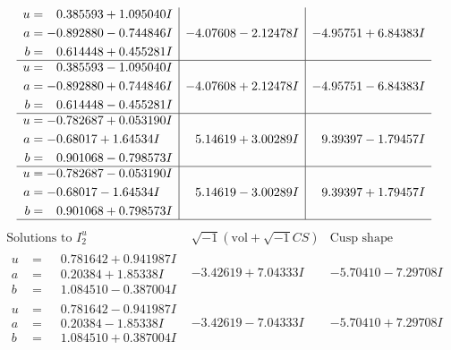 \documentclass[1p]{elsarticle_modified}
\theoremstyle{definition}
\newcommand{\I}{\sqrt{-1}}
\begin{document}
$$\begin{array}{c|c|c}
\begin{aligned}
u &= \phantom{-}0.385593 + 1.095040 I \\
a &= -0.892880 - 0.744846 I \\
b &= \phantom{-}0.614448 + 0.455281 I\end{aligned}
 & -4.07608 - 2.12478 I & -4.95751 + 6.84383 I \\ \hline\begin{aligned}
u &= \phantom{-}0.385593 - 1.095040 I \\
a &= -0.892880 + 0.744846 I \\
b &= \phantom{-}0.614448 - 0.455281 I\end{aligned}
 & -4.07608 + 2.12478 I & -4.95751 - 6.84383 I \\ \hline\begin{aligned}
u &= -0.782687 + 0.053190 I \\
a &= -0.68017 + 1.64534 I \\
b &= \phantom{-}0.901068 - 0.798573 I\end{aligned}
 & \phantom{-}5.14619 + 3.00289 I & \phantom{-}9.39397 - 1.79457 I \\ \hline\begin{aligned}
u &= -0.782687 - 0.053190 I \\
a &= -0.68017 - 1.64534 I \\
b &= \phantom{-}0.901068 + 0.798573 I\end{aligned}
 & \phantom{-}5.14619 - 3.00289 I & \phantom{-}9.39397 + 1.79457 I\\
 \hline 
 \end{array}$$\newpage$$\begin{array}{c|c|c}  
\text{Solutions to }I^u_{2}& \I (\text{vol} + \sqrt{-1}CS) & \text{Cusp shape}\\
 \hline 
\begin{aligned}
u &= \phantom{-}0.781642 + 0.941987 I \\
a &= \phantom{-}0.20384 + 1.85338 I \\
b &= \phantom{-}1.084510 - 0.387004 I\end{aligned}
 & -3.42619 + 7.04333 I & -5.70410 - 7.29708 I \\ \hline\begin{aligned}
u &= \phantom{-}0.781642 - 0.941987 I \\
a &= \phantom{-}0.20384 - 1.85338 I \\
b &= \phantom{-}1.084510 + 0.387004 I\end{aligned}
 & -3.42619 - 7.04333 I & -5.70410 + 7.29708 I \\ \hline\begin{aligned}

\end{aligned}
\end{array}$$
\end{document}
